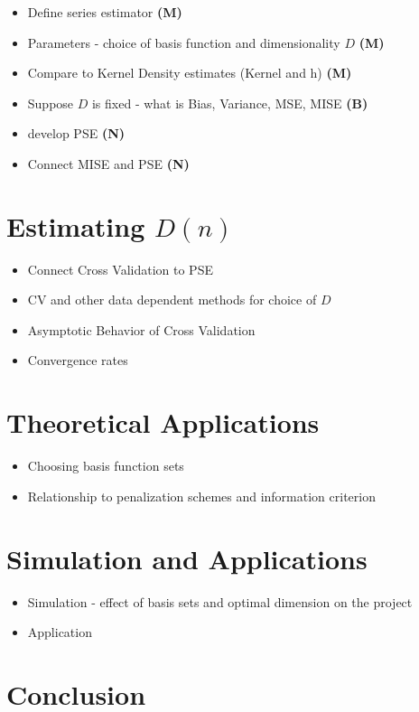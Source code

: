 \documentclass[12pt]{article}  %
\begin{document}
\begin{itemize}
\item Define series estimator \textbf{(M)}
\item Parameters - choice of basis function and dimensionality $D$ \textbf{(M)}
\item Compare to Kernel Density estimates (Kernel and h) \textbf{(M)}
\item Suppose $D$ is fixed - what is Bias, Variance, MSE, MISE \textbf{(B)}
\item develop PSE \textbf{(N)}
\item Connect MISE and PSE \textbf{(N)}
\end{itemize}
\section{Estimating $D(n)$}

\begin{itemize}
\item Connect Cross Validation to PSE 
\item CV and other data dependent methods for choice of $D$
\item Asymptotic Behavior of Cross Validation 
\item Convergence rates
\end{itemize}

\section{Theoretical Applications}
\begin{itemize}
\item Choosing basis function sets 
\item Relationship to penalization schemes and information criterion
\end{itemize}

\section{Simulation and Applications}

\begin{itemize}
\item Simulation - effect of basis sets and optimal dimension on the project 
\item Application 
\end{itemize}


\section{Conclusion}
\end{document}
